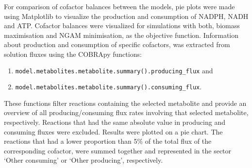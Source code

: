 For comparison of cofactor balances between the models, pie plots were made using Matplotlib to visualize the production and consumption of NADPH, NADH and ATP. %
Cofactor balances were visualized for simulations with both, biomass maximisation and NGAM minimisation, 
as the objective function. Information about production and consumption of specific cofactors, was extracted from solution fluxes using the COBRApy functions:
\vspace{-0.4cm} %
\begin{enumerate}[noitemsep, label=(\roman*)]
    \item \verb|model.metabolites.metabolite.summary().producing_flux| and
    \item \verb|model.metabolites.metabolite.summary().consuming_flux|. 
\end{enumerate}
\vspace{-0.4cm} %
These functions filter reactions containing the selected metabolite and provide an overview of all producing/consuming flux rates involving that selected metabolite, respectively.
Reactions that had the same absolute value in producing and consuming fluxes were excluded. Results were plotted on a pie chart. The reactions that had a lower proportion than 5\% of the total flux of the corresponding cofactor, were summed together and represented in the sector `Other consuming' or `Other producing', respectively.



